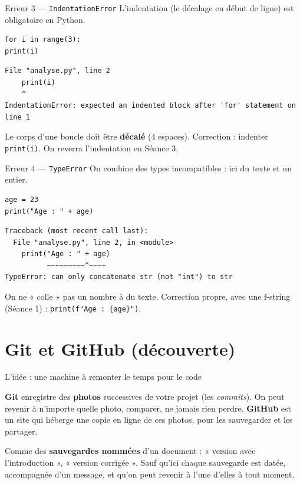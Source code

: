 \documentclass[aspectratio=169,11pt]{beamer}
\begin{document}
\begin{frame}[fragile]{Erreur 3 — \texttt{IndentationError}}
{\small L'indentation (le décalage en début de ligne) est obligatoire en Python.}
\begin{lstlisting}
for i in range(3):
print(i)
\end{lstlisting}
\begin{lstlisting}[style=err]
  File "analyse.py", line 2
    print(i)
    ^
IndentationError: expected an indented block after 'for' statement on line 1
\end{lstlisting}
{\small Le corps d'une boucle doit être \textbf{décalé} (4 espaces). Correction : indenter \texttt{print(i)}. On reverra l'indentation en Séance 3.}
\end{frame}

\begin{frame}[fragile]{Erreur 4 — \texttt{TypeError}}
{\small On combine des types incompatibles : ici du texte et un entier.}
\begin{lstlisting}
age = 23
print("Age : " + age)
\end{lstlisting}
\begin{lstlisting}[style=err]
Traceback (most recent call last):
  File "analyse.py", line 2, in <module>
    print("Age : " + age)
          ~~~~~~~~~^~~~~
TypeError: can only concatenate str (not "int") to str
\end{lstlisting}
{\small On ne « colle » pas un nombre à du texte. Correction propre, avec une f-string (Séance 1) : \texttt{print(f"Age : \{age\}")}.}
\end{frame}

\section{Git et GitHub (découverte)}

\begin{frame}{L'idée : une machine à remonter le temps pour le code}
\begin{ucaddef}
{\small \textbf{Git} enregistre des \textbf{photos} successives de votre projet (les \emph{commits}). On peut revenir à n'importe quelle photo, comparer, ne jamais rien perdre. \textbf{GitHub} est un site qui héberge une copie en ligne de ces photos, pour les sauvegarder et les partager.}
\end{ucaddef}
\begin{ucadfront}[Analogie]
{\small Comme des \textbf{sauvegardes nommées} d'un document : « version avec l'introduction », « version corrigée ». Sauf qu'ici chaque sauvegarde est datée, accompagnée d'un message, et qu'on peut revenir à l'une d'elles à tout moment.}
\end{ucadfront}
\end{frame}
\end{document}
